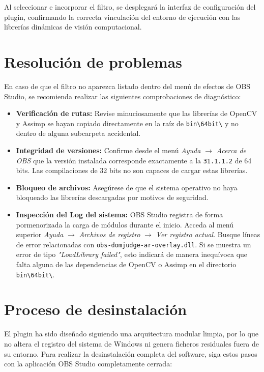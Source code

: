 Al seleccionar e incorporar el filtro, se desplegará la interfaz de configuración del plugin, confirmando la correcta vinculación del entorno de ejecución con las librerías dinámicas de visión computacional.

\section{Resolución de problemas }

En caso de que el filtro no aparezca listado dentro del menú de efectos de OBS Studio, se recomienda realizar las siguientes comprobaciones de diagnóstico:

\begin{itemize}
    \item \textbf{Verificación de rutas:} Revise minuciosamente que las librerías de OpenCV y Assimp se hayan copiado directamente en la raíz de \texttt{bin\textbackslash64bit\textbackslash} y no dentro de alguna subcarpeta accidental.
    \item \textbf{Integridad de versiones:} Confirme desde el menú \textit{Ayuda} $\rightarrow$ \textit{Acerca de OBS} que la versión instalada corresponde exactamente a la \texttt{31.1.1.2} de 64 bits. Las compilaciones de 32 bits no son capaces de cargar estas librerías.
    \item \textbf{Bloqueo de archivos:} Asegúrese de que el sistema operativo no haya bloqueado las librerías descargadas por motivos de seguridad. 
    \item \textbf{Inspección del Log del sistema:} OBS Studio registra de forma pormenorizada la carga de módulos durante el inicio. Acceda al menú superior \textit{Ayuda} $\rightarrow$ \textit{Archivos de registro} $\rightarrow$ \textit{Ver registro actual}. Busque líneas de error relacionadas con \texttt{obs-domjudge-ar-overlay.dll}. Si se muestra un error de tipo \textit{"LoadLibrary failed"}, esto indicará de manera inequívoca que falta alguna de las dependencias de OpenCV o Assimp en el directorio \texttt{bin\textbackslash64bit\textbackslash}.
\end{itemize}

\section{Proceso de desinstalación}

El plugin ha sido diseñado siguiendo una arquitectura modular limpia, por lo que no altera el registro del sistema de Windows ni genera ficheros residuales fuera de su entorno. Para realizar la desinstalación completa del software, siga estos pasos con la aplicación OBS Studio completamente cerrada:

